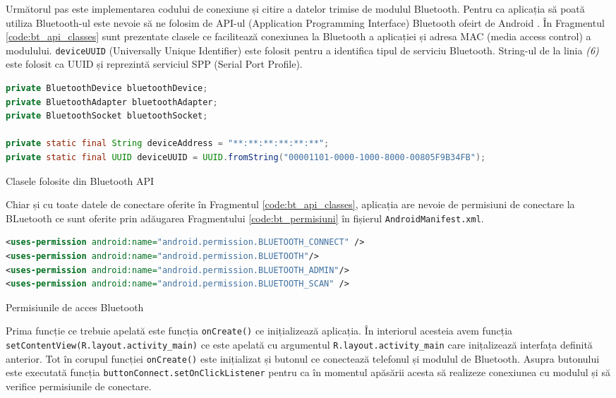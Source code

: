 Următorul pas este implementarea codului de conexiune și citire a datelor trimise de modulul Bluetooth. Pentru ca aplicația să poată utiliza Bluetooth-ul este nevoie să ne folosim de API-ul (Application Programming Interface) Bluetooth ofeirt de Android \cite{bt_api}. În Fragmentul \ref{code:bt_api_classes} sunt prezentate clasele ce facilitează conexiunea la Bluetooth a aplicației și adresa MAC (media access control) a modulului. \texttt{deviceUUID} (Universally Unique Identifier) este folosit pentru a identifica tipul de serviciu Bluetooth. String-ul de la linia \textit{(6)} este folosit ca UUID și reprezintă serviciul SPP (Serial Port Profile).

\begin{code}[H]
\begin{lstlisting}[language=Java]
private BluetoothDevice bluetoothDevice;
private BluetoothAdapter bluetoothAdapter;
private BluetoothSocket bluetoothSocket;

private static final String deviceAddress = "**:**:**:**:**:**";
private static final UUID deviceUUID = UUID.fromString("00001101-0000-1000-8000-00805F9B34FB");

\end{lstlisting}
\caption{Clasele folosite din Bluetooth API \cite{bt_api}}
\label{code:bt_api_classes}
\end{code}

Chiar și cu toate datele de conectare oferite în Fragmentul \ref{code:bt_api_classes}, aplicația are nevoie de permisiuni de conectare la BLuetooth ce sunt oferite prin adăugarea Fragmentului \ref{code:bt_permisiuni} în fișierul \texttt{AndroidManifest.xml}.

\begin{code}[H]
\begin{lstlisting}[language=XML]
<uses-permission android:name="android.permission.BLUETOOTH_CONNECT" />
<uses-permission android:name="android.permission.BLUETOOTH"/>
<uses-permission android:name="android.permission.BLUETOOTH_ADMIN"/>
<uses-permission android:name="android.permission.BLUETOOTH_SCAN" />
\end{lstlisting}
\caption{Permisiunile de acces Bluetooth \cite{bt_perm}}
\label{code:bt_permisiuni}
\end{code}

Prima funcție ce trebuie apelată este funcția \texttt{onCreate()} ce inițializează aplicația. În interiorul acesteia avem funcția \texttt{setContentView(R.layout.activity\_main)} ce este apelată cu argumentul \texttt{R.layout.activity\_main} care inițalizează interfața definită anterior. Tot în corupul funcției \texttt{onCreate()} este inițializat și butonul ce conectează telefonul și modulul de Bluetooth. Asupra butonului este executată funcția \texttt{buttonConnect.setOnClickListener} pentru ca în momentul apăsării acesta să realizeze conexiunea cu modulul și să verifice permisiunile de conectare.

